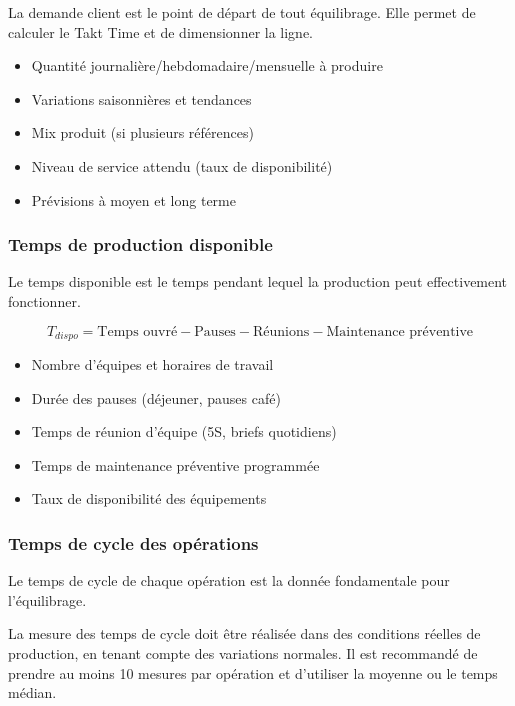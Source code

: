 \documentclass[12pt,a4paper]{article}
\newenvironment{importantnote}
  {\begin{tcolorbox}[colback=blue!5!white, colframe=blue!50!black, title=\textbf{Point Important}]\small}
  {\end{tcolorbox}}
\newenvironment{methodbox}[1]
  {\begin{tcolorbox}[colback=blue!5!white, colframe=methodcolor, title=#1]\small}
  {\end{tcolorbox}}
\begin{document}
La demande client est le point de départ de tout équilibrage. Elle permet de calculer le Takt Time et de dimensionner la ligne.

\begin{methodbox}{Données à collecter sur la demande}
\begin{itemize}
    \item Quantité journalière/hebdomadaire/mensuelle à produire
    \item Variations saisonnières et tendances
    \item Mix produit (si plusieurs références)
    \item Niveau de service attendu (taux de disponibilité)
    \item Prévisions à moyen et long terme
\end{itemize}
\end{methodbox}

\subsubsection{Temps de production disponible}

Le temps disponible est le temps pendant lequel la production peut effectivement fonctionner.

\[
\boxed{T_{dispo} = \text{Temps ouvré} - \text{Pauses} - \text{Réunions} - \text{Maintenance préventive}}
\]

\begin{methodbox}{Éléments à prendre en compte}
\begin{itemize}
    \item Nombre d'équipes et horaires de travail
    \item Durée des pauses (déjeuner, pauses café)
    \item Temps de réunion d'équipe (5S, briefs quotidiens)
    \item Temps de maintenance préventive programmée
    \item Taux de disponibilité des équipements
\end{itemize}
\end{methodbox}

\subsubsection{Temps de cycle des opérations}

Le temps de cycle de chaque opération est la donnée fondamentale pour l'équilibrage.

\begin{importantnote}
La mesure des temps de cycle doit être réalisée dans des conditions réelles de production, en tenant compte des variations normales. Il est recommandé de prendre au moins 10 mesures par opération et d'utiliser la moyenne ou le temps médian.
\end{importantnote}
\end{document}
